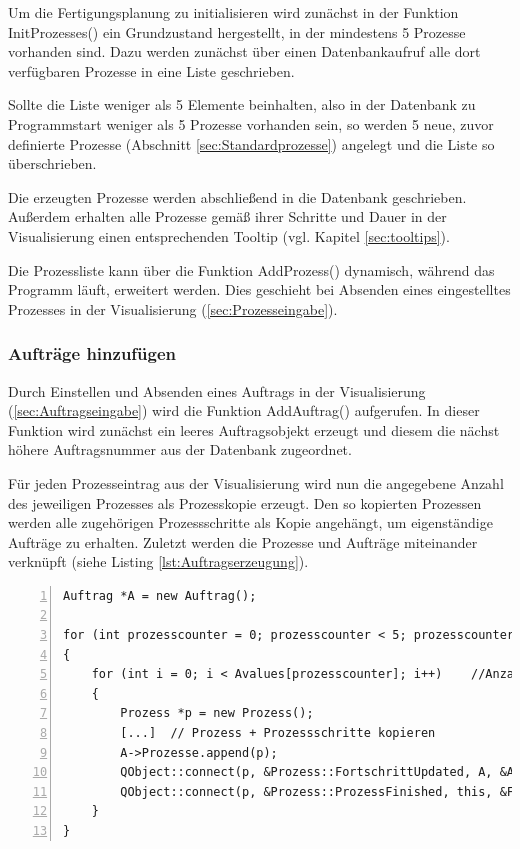 Um die Fertigungsplanung zu initialisieren wird zunächst in der Funktion InitProzesses() ein Grundzustand hergestellt, in der mindestens 5 Prozesse vorhanden sind. Dazu werden zunächst über einen Datenbankaufruf alle dort verfügbaren Prozesse in eine Liste geschrieben. 

Sollte die Liste weniger als 5 Elemente beinhalten, also in der Datenbank zu Programmstart weniger als 5 Prozesse vorhanden sein, so werden 5 neue, zuvor definierte Prozesse (Abschnitt \ref{sec:Standardprozesse}) angelegt und die Liste so überschrieben. 

Die erzeugten Prozesse werden abschließend in die Datenbank geschrieben. Außerdem erhalten alle Prozesse gemäß ihrer Schritte und Dauer in der Visualisierung einen entsprechenden Tooltip (vgl. Kapitel \ref{sec:tooltips}). 

Die Prozessliste kann über die Funktion AddProzess() dynamisch, während das Programm läuft, erweitert werden. Dies geschieht bei Absenden eines eingestelltes Prozesses in der Visualisierung (\ref{sec:Prozesseingabe}). 

\subsubsection{Aufträge hinzufügen}

Durch Einstellen und Absenden eines Auftrags in der Visualisierung (\ref{sec:Auftragseingabe}) wird die Funktion AddAuftrag() aufgerufen. In dieser Funktion wird zunächst ein leeres Auftragsobjekt erzeugt und diesem die nächst höhere Auftragsnummer aus der Datenbank zugeordnet.  

Für jeden Prozesseintrag aus der Visualisierung wird nun die angegebene Anzahl des jeweiligen Prozesses als Prozesskopie erzeugt. Den so kopierten Prozessen werden alle zugehörigen Prozessschritte als Kopie angehängt, um eigenständige Aufträge zu erhalten. Zuletzt werden die Prozesse und Aufträge miteinander verknüpft (siehe Listing \ref{lst:Auftragserzeugung}).

\begin{lstlisting}[frame=single, breaklines=true, numbers=left, stepnumber=2, firstnumber=1, numberstyle = \tiny, caption=Auftragserzeugung und Verknüpfungen,label=lst:Auftragserzeugung]
Auftrag *A = new Auftrag();

for (int prozesscounter = 0; prozesscounter < 5; prozesscounter++) //5 Prozess UI Elemente
{
    for (int i = 0; i < Avalues[prozesscounter]; i++)    //Anzahl der eingegebenen Prozesszahl
    {
        Prozess *p = new Prozess();
        [...]  // Prozess + Prozessschritte kopieren
        A->Prozesse.append(p);
        QObject::connect(p, &Prozess::FortschrittUpdated, A, &Auftrag::UpdateFortschritt);
        QObject::connect(p, &Prozess::ProzessFinished, this, &Fertigungsplanung::StationReady);
    }
}
\end{lstlisting}

